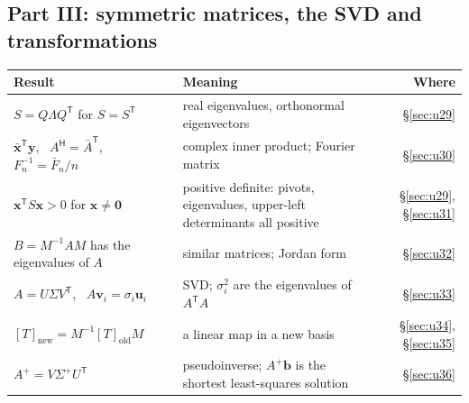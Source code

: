 \documentclass[11pt]{article}
\theoremstyle{definition}
\theoremstyle{plain}
\theoremstyle{remark}
\newcommand{\vb}[1]{\boldsymbol{#1}}          %
\newcommand{\T}{^{\mathsf{T}}}                 %
\begin{document}
\subsection*{Part III: symmetric matrices, the SVD and transformations}
\begin{longtable}{@{}p{}p{}r@{}}
\toprule
Result & Meaning & Where \\
\midrule
$S=Q\Lambda Q\T$ for $S=S\T$ & real eigenvalues, orthonormal eigenvectors & \S\ref{sec:u29} \\
$\bar{\vb{x}}\T\vb{y}$, \ $A^{\mathsf H}=\bar A\T$, \ $F_n^{-1}=\bar F_n/n$ & complex inner product; Fourier matrix & \S\ref{sec:u30} \\
$\vb{x}\T S\vb{x}>0$ for $\vb{x}\neq\vb{0}$ & positive definite: pivots, eigenvalues, upper-left determinants all positive & \S\ref{sec:u29}, \S\ref{sec:u31} \\
$B=M^{-1}AM$ has the eigenvalues of $A$ & similar matrices; Jordan form & \S\ref{sec:u32} \\
$A=U\Sigma V\T$, \ $A\vb{v}_i=\sigma_i\vb{u}_i$ & SVD; $\sigma_i^2$ are the eigenvalues of $A\T A$ & \S\ref{sec:u33} \\
$[T]_{\text{new}}=M^{-1}[T]_{\text{old}}M$ & a linear map in a new basis & \S\ref{sec:u34}, \S\ref{sec:u35} \\
$A^{+}=V\Sigma^{+}U\T$ & pseudoinverse; $A^{+}\vb{b}$ is the shortest least-squares solution & \S\ref{sec:u36} \\
\bottomrule
\end{longtable}
\end{document}
